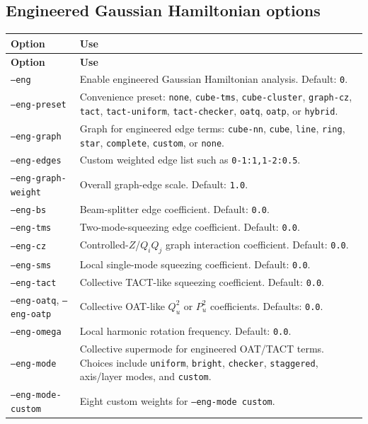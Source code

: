 \documentclass[11pt]{article}
\begin{document}
\subsection{Engineered Gaussian Hamiltonian options}
\begin{longtable}{L{0.31\textwidth}L{0.61\textwidth}}
\toprule
\textbf{Option} & \textbf{Use} \\
\midrule
\endfirsthead
\toprule
\textbf{Option} & \textbf{Use} \\
\midrule
\endhead
\texttt{--eng} & Enable engineered Gaussian Hamiltonian analysis. Default: \texttt{0}. \\
\texttt{--eng-preset} & Convenience preset: \texttt{none}, \texttt{cube-tms}, \texttt{cube-cluster}, \texttt{graph-cz}, \texttt{tact}, \texttt{tact-uniform}, \texttt{tact-checker}, \texttt{oatq}, \texttt{oatp}, or \texttt{hybrid}. \\
\texttt{--eng-graph} & Graph for engineered edge terms: \texttt{cube-nn}, \texttt{cube}, \texttt{line}, \texttt{ring}, \texttt{star}, \texttt{complete}, \texttt{custom}, or \texttt{none}. \\
\texttt{--eng-edges} & Custom weighted edge list such as \texttt{0-1:1,1-2:0.5}. \\
\texttt{--eng-graph-weight} & Overall graph-edge scale. Default: \texttt{1.0}. \\
\texttt{--eng-bs} & Beam-splitter edge coefficient. Default: \texttt{0.0}. \\
\texttt{--eng-tms} & Two-mode-squeezing edge coefficient. Default: \texttt{0.0}. \\
\texttt{--eng-cz} & Controlled-\(Z\)/\(Q_iQ_j\) graph interaction coefficient. Default: \texttt{0.0}. \\
\texttt{--eng-sms} & Local single-mode squeezing coefficient. Default: \texttt{0.0}. \\
\texttt{--eng-tact} & Collective TACT-like squeezing coefficient. Default: \texttt{0.0}. \\
\texttt{--eng-oatq}, \texttt{--eng-oatp} & Collective OAT-like \(Q_u^2\) or \(P_u^2\) coefficients. Defaults: \texttt{0.0}. \\
\texttt{--eng-omega} & Local harmonic rotation frequency. Default: \texttt{0.0}. \\
\texttt{--eng-mode} & Collective supermode for engineered OAT/TACT terms. Choices include \texttt{uniform}, \texttt{bright}, \texttt{checker}, \texttt{staggered}, axis/layer modes, and \texttt{custom}. \\
\texttt{--eng-mode-custom} & Eight custom weights for \texttt{--eng-mode custom}. \\

\end{longtable}
\end{document}
